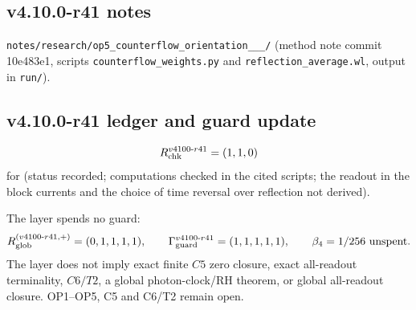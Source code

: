 \subsection*{v4.10.0-r41 notes}
\label{subsec:v4100-r41-notes}

\texttt{notes/\allowbreak research/\allowbreak op5\_\allowbreak counterflow\_\allowbreak orientation\_\_\_/} (method note commit 10e483e1,
scripts \texttt{counterflow\_\allowbreak weights.py} and \texttt{reflection\_\allowbreak average.wl}, output in \texttt{run/}).

\subsection*{v4.10.0-r41 ledger and guard update}
\label{subsec:v4100-r41-ledger-guard}

\[
R_{\rm chk}^{v4100\text{-}r41}=(1,1,0)
\]
for (status recorded; computations checked in the cited scripts; the readout in the block currents and the choice of time reversal over
reflection not derived).

The layer spends no guard:
\[
R_{\rm glob}^{(v4100\text{-}r41,+)}=(0,1,1,1,1),
\qquad
\Gamma_{\rm guard}^{v4100\text{-}r41}=(1,1,1,1,1),
\qquad
\beta_4=1/256\ \text{unspent}.
\]
The layer does not imply exact finite \(C5\) zero closure, exact all-readout terminality, \(C6/T2\), a global photon-clock/RH theorem,
or global all-readout closure.  OP1--OP5, C5 and C6/T2 remain open.
